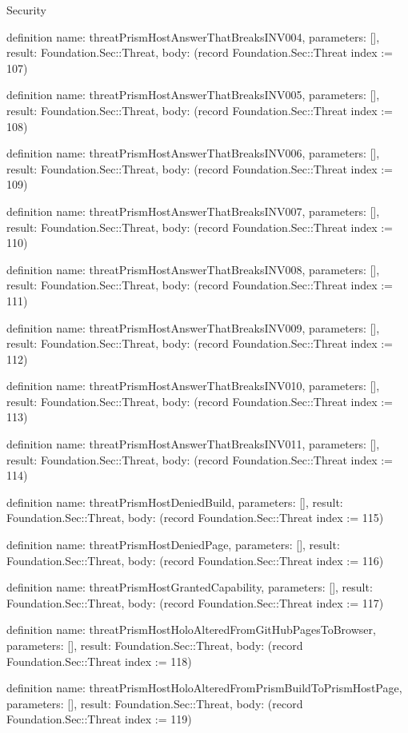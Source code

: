 \begin{lexlean}{Security}
\begin{semanticmodule}
definition{
  name: threatPrismHostAnswerThatBreaksINV004,
  parameters: [],
  result: Foundation.Sec::Threat,
  body: (record Foundation.Sec::Threat {index := 107})
}

definition{
  name: threatPrismHostAnswerThatBreaksINV005,
  parameters: [],
  result: Foundation.Sec::Threat,
  body: (record Foundation.Sec::Threat {index := 108})
}

definition{
  name: threatPrismHostAnswerThatBreaksINV006,
  parameters: [],
  result: Foundation.Sec::Threat,
  body: (record Foundation.Sec::Threat {index := 109})
}

definition{
  name: threatPrismHostAnswerThatBreaksINV007,
  parameters: [],
  result: Foundation.Sec::Threat,
  body: (record Foundation.Sec::Threat {index := 110})
}

definition{
  name: threatPrismHostAnswerThatBreaksINV008,
  parameters: [],
  result: Foundation.Sec::Threat,
  body: (record Foundation.Sec::Threat {index := 111})
}

definition{
  name: threatPrismHostAnswerThatBreaksINV009,
  parameters: [],
  result: Foundation.Sec::Threat,
  body: (record Foundation.Sec::Threat {index := 112})
}

definition{
  name: threatPrismHostAnswerThatBreaksINV010,
  parameters: [],
  result: Foundation.Sec::Threat,
  body: (record Foundation.Sec::Threat {index := 113})
}

definition{
  name: threatPrismHostAnswerThatBreaksINV011,
  parameters: [],
  result: Foundation.Sec::Threat,
  body: (record Foundation.Sec::Threat {index := 114})
}

definition{
  name: threatPrismHostDeniedBuild,
  parameters: [],
  result: Foundation.Sec::Threat,
  body: (record Foundation.Sec::Threat {index := 115})
}

definition{
  name: threatPrismHostDeniedPage,
  parameters: [],
  result: Foundation.Sec::Threat,
  body: (record Foundation.Sec::Threat {index := 116})
}

definition{
  name: threatPrismHostGrantedCapability,
  parameters: [],
  result: Foundation.Sec::Threat,
  body: (record Foundation.Sec::Threat {index := 117})
}

definition{
  name: threatPrismHostHoloAlteredFromGitHubPagesToBrowser,
  parameters: [],
  result: Foundation.Sec::Threat,
  body: (record Foundation.Sec::Threat {index := 118})
}

definition{
  name: threatPrismHostHoloAlteredFromPrismBuildToPrismHostPage,
  parameters: [],
  result: Foundation.Sec::Threat,
  body: (record Foundation.Sec::Threat {index := 119})
}


\end{semanticmodule}
\end{lexlean}
